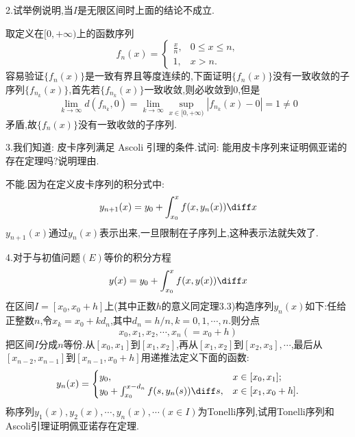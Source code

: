 2.试举例说明,当$I$是无限区间时上面的结论不成立.

\begin{solve}
取定义在$[0,+\infty)$上的函数序列
\[f_n(x)=\begin{cases}
\frac{x}{n},&0\leq x\leq n,\\
1,&x>n.
\end{cases}\]
容易验证$\{f_n(x)\}$是一致有界且等度连续的,下面证明$\{f_n(x)\}$没有一致收敛的子序列$\{f_{n_k}(x)\}$,首先若$\{f_{n_k}(x)\}$一致收敛,则必收敛到0,但是
\[\lim_{k\to\infty}d(f_{n_k},0)=\lim_{k\to\infty}\sup_{x\in[0,+\infty)}|f_{n_k}(x)-0|=1\neq0\]
矛盾,故$\{f_n(x)\}$没有一致收敛的子序列.
\end{solve}


3.我们知道: 皮卡序列满足 Ascoli 引理的条件.试问: 能用皮卡序列来证明佩亚诺的存在定理吗?说明理由.

\begin{solve}
不能.因为在定义皮卡序列的积分式中:
\[y_{n+1}(x)=y_0+\int_{x_0}^xf(x,y_n(x))\diff x\]
$y_{n+1}(x)$通过$y_n(x)$表示出来,一旦限制在子序列上,这种表示法就失效了.
\end{solve}


4.对于与初值问题$(E)$等价的积分方程
\[y(x)=y_0+\int_{x_0}^xf(x,y(x))\diff x\]
在区间$I=[x_0,x_0+h]$上(其中正数$h$的意义同定理3.3)构造序列$y_n(x)$如下:任给正整数$n$,令$x_k=x_0+kd_n$,其中$d_n=h/n,k=0,1,\cdots,n$.则分点
\[x_0,x_1,x_2,\cdots,x_n(=x_0+h)\]
把区间$I$分成$n$等份.从$[x_0,x_1]$到$[x_1,x_2]$,再从$[x_1,x_2]$到$[x_2,x_3],\cdots$,最后从$[x_{n-2},x_{n-1}]$到$[x_{n-1},x_0+h]$用递推法定义下面的函数:
\[y_n(x)=\begin{cases}
y_0,&x\in[x_0,x_1];\\
y_0+\int_{x_0}^{x-d_n}f(s,y_n(s))\diff s,&x\in[x_1,x_0+h].
\end{cases}\]
称序列$y_1(x),y_2(x),\cdots,y_n(x),\cdots(x\in I)$为Tonelli序列,试用Tonelli序列和Ascoli引理证明佩亚诺存在定理.

